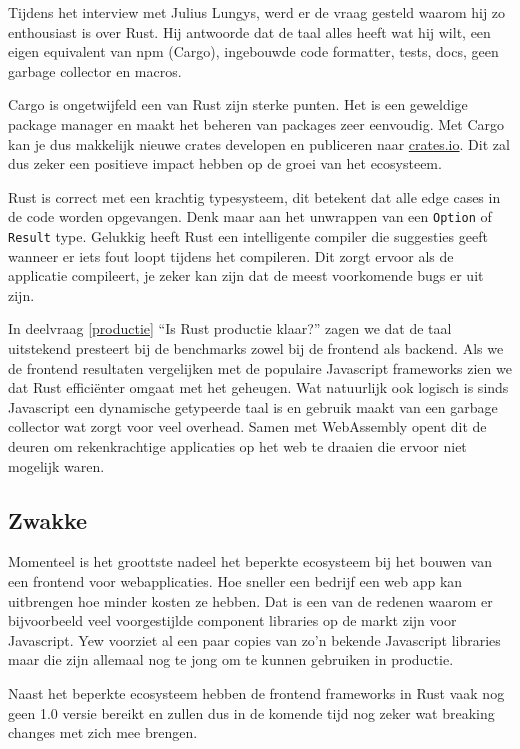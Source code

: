 Tijdens het interview met Julius Lungys, werd er de vraag gesteld waarom hij zo enthousiast is over
Rust. Hij antwoorde dat de taal alles heeft wat hij wilt, een eigen equivalent van npm (Cargo),
ingebouwde code formatter, tests, docs, geen garbage collector en macros.

Cargo is ongetwijfeld een van Rust zijn sterke punten. Het is een geweldige package manager en maakt
het beheren van packages zeer eenvoudig. Met Cargo kan je dus makkelijk nieuwe crates developen en
publiceren naar \url{crates.io}. Dit zal dus zeker een positieve impact hebben op de groei van het
ecosysteem.

Rust is correct met een krachtig typesysteem, dit betekent dat alle edge cases in de code worden
opgevangen. Denk maar aan het unwrappen van een \texttt{Option} of
\texttt{Result} type. Gelukkig heeft Rust een intelligente compiler die suggesties geeft
wanneer er iets fout loopt tijdens het compileren. Dit zorgt ervoor als de applicatie compileert, je
zeker kan zijn dat de meest voorkomende bugs er uit zijn.

In deelvraag \ref{productie} \enquote{Is Rust productie klaar?} zagen we dat de taal uitstekend
presteert bij de benchmarks zowel bij de frontend als backend. Als we de frontend resultaten
vergelijken met de populaire Javascript frameworks zien we dat Rust efficiënter omgaat met het
geheugen. Wat natuurlijk ook logisch is sinds Javascript een dynamische getypeerde taal is en
gebruik maakt van een garbage collector wat zorgt voor veel overhead. Samen met WebAssembly opent
dit de deuren om rekenkrachtige applicaties op het web te draaien die ervoor niet mogelijk waren.

\subsection{Zwakke}

Momenteel is het groottste nadeel het beperkte ecosysteem bij het bouwen van een frontend voor
webapplicaties. Hoe sneller een bedrijf een web app kan uitbrengen hoe minder kosten ze hebben. Dat
is een van de redenen waarom er bijvoorbeeld veel voorgestijlde component libraries op de markt zijn
voor Javascript. Yew voorziet al een paar copies van zo'n bekende Javascript libraries maar die zijn
allemaal nog te jong om te kunnen gebruiken in productie.

Naast het beperkte ecosysteem hebben de frontend frameworks in Rust vaak nog geen 1.0 versie bereikt
en zullen dus in de komende tijd nog zeker wat breaking changes met zich mee brengen.

